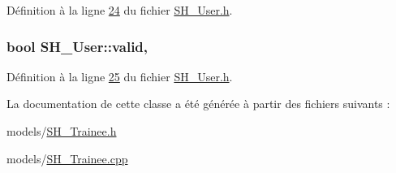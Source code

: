 Définition à la ligne \hyperlink{SH__User_8h_source_l00024}{24} du fichier \hyperlink{SH__User_8h_source}{S\-H\-\_\-\-User.\-h}.

\hypertarget{classSH__User_a91cae1175894bf2eef629405638db01c}{
\subsubsection[{valid}]{\setlength{\rightskip}{0pt plus 5cm}bool S\-H\-\_\-\-User\-::valid\hspace{0.3cm}{\ttfamily [read]}, {\ttfamily [inherited]}}}\label{classSH__User_a91cae1175894bf2eef629405638db01c}


Définition à la ligne \hyperlink{SH__User_8h_source_l00025}{25} du fichier \hyperlink{SH__User_8h_source}{S\-H\-\_\-\-User.\-h}.



La documentation de cette classe a été générée à partir des fichiers suivants \-:\begin{DoxyCompactItemize}
\item 
models/\hyperlink{SH__Trainee_8h}{S\-H\-\_\-\-Trainee.\-h}\item 
models/\hyperlink{SH__Trainee_8cpp}{S\-H\-\_\-\-Trainee.\-cpp}\end{DoxyCompactItemize}
